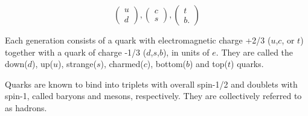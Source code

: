 \begin{equation}
	\begin{pmatrix}
		u\\
		d
	\end{pmatrix},
\begin{pmatrix}
		c\\
		s
	\end{pmatrix},
	\begin{pmatrix}
		t\\
		b.
	\end{pmatrix}
\end{equation}

Each generation consists of a quark with electromagnetic charge +2/3 ($u$,$c$, or $t$) together with a quark of charge -1/3 ($d$,$s$,$b$), in units of $e$. They are called the down($d$), up($u$), strange($s$), charmed($c$), bottom($b$) and top($t$) quarks. 

Quarks are known to bind into triplets with overall spin-1/2 and doublets with spin-1, called baryons and mesons, respectively. They are collectively referred to as hadrons.








